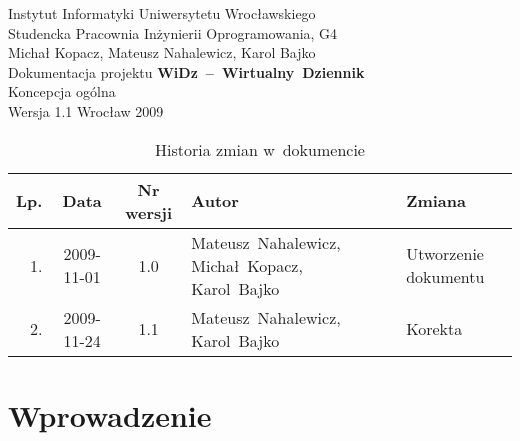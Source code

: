 \documentclass[12pt,leqno,twoside]{mwart}
\renewcommand{\sectionmark}[1]{\markright{\thesection.\ #1. }}
\renewcommand{\sectionmark}[1]{\markright{\thesection.\ #1}}
\renewcommand{\headrulewidth}{0.4pt}
\renewcommand{\footrulewidth}{0.0pt}
\begin{document}
\begin{titlepage}
\begin{center}
Instytut Informatyki Uniwersytetu Wrocławskiego \\
Studencka Pracownia Inżynierii Oprogramowania, G4 \\
\vspace{4cm}
\Large Michał Kopacz, Mateusz Nahalewicz, Karol Bajko \\
\vspace{0.5cm}
\huge Dokumentacja projektu \mbox{\textbf{WiDz -- Wirtualny Dziennik}} \\ \Large Koncepcja ogólna\\
\vspace{1cm}
\normalsize Wersja 1.1
\vfill
\normalsize Wrocław 2009
\end{center}
\end{titlepage}

\newpage
\vfill
\begin{table}[tb]
	\centering
	\caption{Historia zmian w~dokumencie}
		\begin{tabular}{|r|c|c|p{}|l|}
		\hline
		Lp. 	& Data       & Nr wersji 	& Autor           		& Zmiana \\ \hline
		1.   	& 2009-11-01 & 1.0       	& \mbox{Mateusz Nahalewicz,} \mbox{Michał Kopacz,} \mbox{Karol Bajko} & Utworzenie dokumentu \\ \hline
		2.   	& 2009-11-24 & 1.1       	& \mbox{Mateusz Nahalewicz}, \mbox{Karol Bajko} & Korekta \\ \hline
		\end{tabular}
\end{table}

\clearpage
\thispagestyle{fancy}
\fancyhead{}
\tableofcontents
\newpage

\pagestyle{fancy}
\fancyhead{}
\renewcommand{\sectionmark}[1]{\markright{\thesection.\ #1. }}
\renewcommand{\sectionmark}[1]{\markright{\thesection.\ #1}}
\fancyhead[RO]{\rightmark}
\fancyfoot{} %
\fancyfoot[LE,RO]{}
\fancyfoot[CE]{\thepage}
\fancyfoot[CO]{\thepage}
\addtolength{\headheight}{1.5pt} %
\renewcommand{\headrulewidth}{0.4pt}
\renewcommand{\footrulewidth}{0.0pt}

\section{Wprowadzenie}
\end{document}
